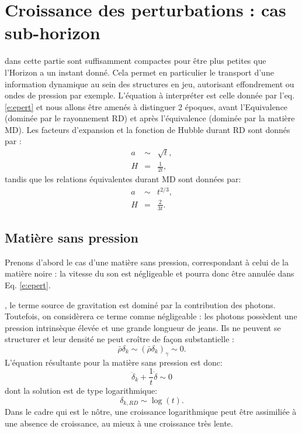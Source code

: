  \section{Croissance des perturbations : cas sub-horizon}
  dans cette partie sont suffisamment compactes pour être plus petites que l'Horizon a un instant donné. Cela permet en particulier le transport d'une information dynamique au sein des structures en jeu, autorisant effondrement ou ondes de pression par exemple. L'équation à interpréter est celle donnée par l'eq. \ref{e:epert} et nous allons être amenés à distinguer 2 époques, avant l'Equivalence (dominée par le rayonnement RD) et après l'équivalence (dominée par la matière MD). Les facteurs d'expansion et la fonction de Hubble  durant RD sont donnés par :
 \begin{eqnarray}
 a&\sim& \sqrt{t},\\
 H&=&\frac{1}{2t},
 \end{eqnarray}
 tandis que les relations équivalentes durant MD sont données par:
 \begin{eqnarray}
 a&\sim&t^{2/3},\\
 H&=&\frac{2}{3t}.
 \end{eqnarray}
 
  \subsection{Matière sans pression}
Prenons d'abord le cas d'une matière sans pression, correspondant à celui de la matière noire : la vitesse du son est négligeable et pourra donc être annulée dans Eq. \ref{e:epert}.

, le terme source de gravitation est dominé par la contribution des photons. Toutefois, on considèrera ce terme comme négligeable : les photons possèdent une pression intrinsèque élevée et une grande longueur de jeans. Ils ne peuvent se structurer et leur densité ne peut croître de façon substantielle :
\begin{equation}
\bar \rho \delta_k \sim(\bar \rho \delta_k)_\gamma \sim 0.
\end{equation}
L'équation résultante pour la matière sans pression est donc: 
\begin{equation}
\ddot \delta_k+\frac{1}{t}\dot \delta \sim 0
\end{equation}
dont la solution est de type logarithmique:
\begin{equation}
\delta_{k,RD}\sim \log(t).
\end{equation}
Dans le cadre qui est le nôtre, une croissance logarithmique peut être assimiliée à une absence de croissance, au mieux à une croissance très lente.

